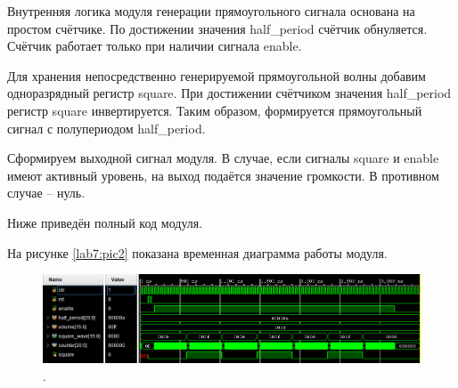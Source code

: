 Внутренняя логика модуля генерации прямоугольного сигнала основана на простом счётчике. По достижении значения half\_period счётчик обнуляется. Счётчик работает только при наличии сигнала enable.

\noindent
\begin{minipage}{\linewidth}
	
\end{minipage}

Для хранения непосредственно генерируемой прямоугольной волны добавим одноразрядный регистр square.
При достижении счётчиком значения half\_period регистр square инвертируется. Таким образом, формируется прямоугольный сигнал с полупериодом half\_period.

\noindent
\begin{minipage}{\linewidth}
	
\end{minipage}

Сформируем выходной сигнал модуля. В случае, если сигналы square и enable имеют активный уровень, на выход подаётся значение громкости. В противном случае -- нуль.

\noindent
\begin{minipage}{\linewidth}
	
\end{minipage}

Ниже приведён полный код модуля.

\noindent
\begin{minipage}{\linewidth}
	
\end{minipage}


На рисунке \ref{lab7:pic2} показана временная диаграмма работы модуля.

\begin{figure}[H]
	\centering
	\includegraphics [width=1\textwidth] {images/lab_7/square_simulate.PNG}
	\caption{.}
	\label{lab7:pic3}
\end{figure}



